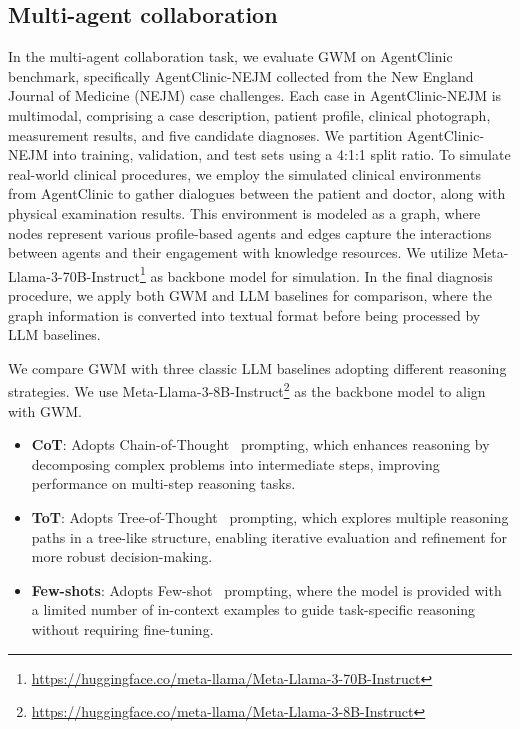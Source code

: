 
\subsection{Multi-agent collaboration} \label{apd:agent}

 In the multi-agent collaboration task, we evaluate GWM on AgentClinic~\cite{schmidgall2024agentclinic} benchmark, specifically AgentClinic-NEJM collected from the New England Journal of Medicine (NEJM) case challenges. Each case in AgentClinic-NEJM is multimodal, comprising a case description, patient profile, clinical photograph, measurement results, and five candidate diagnoses. We partition AgentClinic-NEJM into training, validation, and test sets using a 4:1:1 split ratio. To simulate real-world clinical procedures, we employ the simulated clinical environments from AgentClinic to gather dialogues between the patient and doctor, along with physical examination results. This environment is modeled as a graph, where nodes represent various profile-based agents and edges capture the interactions between agents and their engagement with knowledge resources. We utilize Meta-Llama-3-70B-Instruct\footnote{\href{https://huggingface.co/meta-llama/Meta-Llama-3-70B-Instruct}{https://huggingface.co/meta-llama/Meta-Llama-3-70B-Instruct}} as backbone model for simulation. In the final diagnosis procedure, we apply both GWM and LLM baselines for comparison, where the graph information is converted into textual format before being processed by LLM baselines.

 We compare GWM with three classic LLM baselines adopting different reasoning strategies. We use Meta-Llama-3-8B-Instruct\footnote{\href{https://huggingface.co/meta-llama/Meta-Llama-3-8B-Instruct}{https://huggingface.co/meta-llama/Meta-Llama-3-8B-Instruct}} as the backbone model to align with GWM.
 \begin{itemize}[leftmargin=1em, itemsep=0pt] 
 \item \textbf{CoT}: Adopts Chain-of-Thought~\cite{wei2022chain} prompting, which enhances reasoning by decomposing complex problems into intermediate steps, improving performance on multi-step reasoning tasks.
\item  \textbf{ToT}: Adopts Tree-of-Thought~\cite{yao2024tree} prompting, which explores multiple reasoning paths in a tree-like structure, enabling iterative evaluation and refinement for more robust decision-making.
\item \textbf{Few-shots}: Adopts Few-shot~\cite{brown2020languagemodelsfewshotlearners} prompting, where the model is provided with a limited number of in-context examples to guide task-specific reasoning without requiring fine-tuning.
 \end{itemize}


